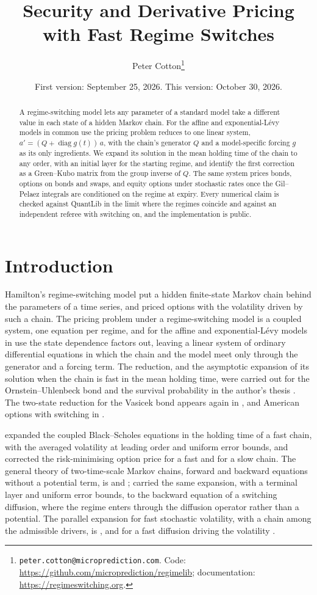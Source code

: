 \documentclass[11pt]{article}
\title{Security and Derivative Pricing with Fast Regime Switches}
\author{Peter Cotton\thanks{\texttt{peter.cotton@microprediction.com}. Code: \url{https://github.com/microprediction/regimelib}; documentation: \url{https://regimeswitching.org}.}}
\date{First version: September 25, 2026. This version: October 30, 2026.}
\theoremstyle{remark}
\newcommand{\diag}{\operatorname{diag}}
\newcommand{\ql}{\textsf{QuantLib}}
\begin{document}
\maketitle

\begin{abstract}
A regime-switching model lets any parameter of a standard model take a different value in each state of a
hidden Markov chain. For the affine and exponential-L\'evy models in common use the pricing problem reduces to
one linear system, $a' = (Q + \diag g(t))\,a$, with the chain's generator $Q$ and a model-specific forcing $g$ as
its only ingredients. We expand its solution in the mean holding time of the chain to any order, with an initial
layer for the starting regime, and identify the first correction as a Green--Kubo matrix from the group inverse
of $Q$. The same system prices bonds, options on bonds and swaps, and equity options under stochastic rates once
the Gil--Pelaez integrals are conditioned on the regime at expiry. Every numerical claim is checked against \ql{} in the limit where the regimes coincide and against an
independent referee with switching on, and the implementation is public.
\end{abstract}

\section{Introduction}

Hamilton's regime-switching model \citep{hamilton1989} put a hidden finite-state Markov chain behind the
parameters of a time series, and \citet{naik1993} priced options with the volatility driven by such a chain. The
pricing problem under a regime-switching model is a coupled system, one equation per regime, and for the affine
and exponential-L\'evy models in use the state dependence factors out, leaving a linear system of ordinary
differential equations in which the chain and the model meet only through the generator and a forcing term. The
reduction, and the asymptotic expansion of its solution when the chain is fast in the mean holding time, were
carried out for the Ornstein--Uhlenbeck bond and the survival probability in the author's thesis
\citep{cotton2001}. The two-state reduction for the Vasicek bond appears again in \citet{elliott2002}, and
American options with switching in \citet{buffington2002}.

\citet{yin2009option} expanded the coupled
Black--Scholes equations in the holding time of a fast chain, with the averaged volatility at leading order and
uniform error bounds, and \citet{basu2009} corrected the risk-minimising option price for a fast and for a slow
chain. The general theory of two-time-scale Markov chains, forward and backward equations without a potential
term, is \citet{yin2013} and \citet{yin2009backward}; \citet{nguyen2011,nguyen2013} carried the same expansion,
with a terminal layer and uniform error bounds, to the backward equation of a switching diffusion, where the
regime enters through the diffusion operator rather than a potential. The parallel expansion for fast stochastic
volatility, with a chain among the admissible drivers, is \citet{sircar1999}, and for a fast diffusion driving the
volatility \citet{khasminskii2005}.
\end{document}
